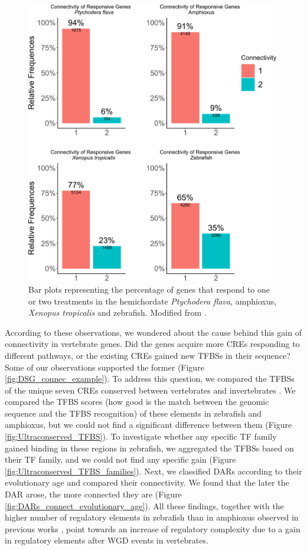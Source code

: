 \begin{figure}[hp]
\centering
\includegraphics[width=1\textwidth]{Figures/Connectivity_new_species}
\caption[Connectivity of the new species]{Bar plots representing the percentage of genes that respond to one or two treatments in the hemichordate \textit{Ptychodera flava}, amphioxus, \textit{Xenopus tropicalis} and zebrafish. Modified from \parencite{gil-galvez_gain_2022}.}
\label{fig:Connectivity_new_species}
\end{figure} 


According to these observations, we wondered about the cause behind this gain of connectivity in vertebrate genes. Did the genes acquire more CREs responding to different pathways, or the existing CREs gained new TFBSs in their sequence? Some of our observations supported the former (Figure \ref{fig:DSG_connec_example}). To address this question, we compared the TFBSs of the unique seven CREs conserved between vertebrates and invertebrates \parencite{royo_transphyletic_2011}. We compared the TFBS scores (how good is the match between the genomic sequence and the TFBS recognition) of these elements in zebrafish and amphioxus, but we could not find a significant difference between them (Figure \ref{fig:Ultraconserved_TFBS}). To investigate whether any specific TF family gained binding in these regions in zebrafish, we aggregated the TFBSs based on their TF family, and we could not find any specific gain (Figure \ref{fig:Ultraconserved_TFBS_families}). Next, we classified DARs according to their evolutionary age and compared their connectivity. We found that the later the DAR arose, the more connected they are (Figure \ref{fig:DARs_connect_evolutionary_age}). 
All these findings, together with the higher number of regulatory elements in zebrafish than in amphioxus observed in previous works \parencite{marletaz_amphioxus_2018}, point towards an increase of regulatory complexity due to a gain in regulatory elements after WGD events in vertebrates.


